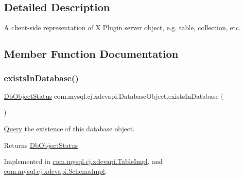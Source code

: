 \subsection{Detailed Description}
A client-\/side representation of X Plugin server object, e.\+g. table, collection, etc. 

\subsection{Member Function Documentation}
\mbox{\label{interfacecom_1_1mysql_1_1cj_1_1xdevapi_1_1_database_object_ab4215a82b546a9e1dcb344c339765d7a}} 
\subsubsection{\texorpdfstring{exists\+In\+Database()}{existsInDatabase()}}
{\footnotesize\ttfamily \mbox{\hyperlink{enumcom_1_1mysql_1_1cj_1_1xdevapi_1_1_database_object_1_1_db_object_status}{Db\+Object\+Status}} com.\+mysql.\+cj.\+xdevapi.\+Database\+Object.\+exists\+In\+Database (\begin{DoxyParamCaption}{ }\end{DoxyParamCaption})}

\mbox{\hyperlink{interfacecom_1_1mysql_1_1cj_1_1_query}{Query}} the existence of this database object.

\begin{DoxyReturn}{Returns}
\mbox{\hyperlink{enumcom_1_1mysql_1_1cj_1_1xdevapi_1_1_database_object_1_1_db_object_status}{Db\+Object\+Status}} 
\end{DoxyReturn}


Implemented in \mbox{\hyperlink{classcom_1_1mysql_1_1cj_1_1xdevapi_1_1_table_impl_aa51ee706e090fe9acd2e81c313e5a6eb}{com.\+mysql.\+cj.\+xdevapi.\+Table\+Impl}}, and \mbox{\hyperlink{classcom_1_1mysql_1_1cj_1_1xdevapi_1_1_schema_impl_a587cff9708d8d6787ad6012fd0353d5f}{com.\+mysql.\+cj.\+xdevapi.\+Schema\+Impl}}.

\mbox{\label{interfacecom_1_1mysql_1_1cj_1_1xdevapi_1_1_database_object_a482b3ae6f40ec6332bb7d8d8d02d1dda}} 
